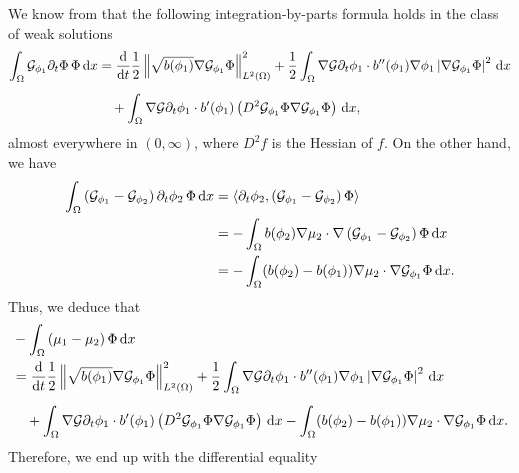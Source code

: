 \documentclass[11pt,reqno]{amsart}
\theoremstyle{remark}
\newcommand \norm[1] {\left\Vert #1\right\Vert}
\def\G{\mathcal{G}}
\def\d{{\rm d}}
\def \l {\langle}
\def \r {\rangle}
\def\uu{\boldsymbol{u}}
\def\ddt{\frac{\d}{\d t}}
\numberwithin{equation}{section}
\def\d{{\rm d}}
\begin{document}
We know from \cite[eq. (3.16)]{CGGG2025} that the following integration-by-parts  formula holds in the class of weak solutions
\begin{align}
\int_\Omega \G_{\phi_1} \partial_t \Phi \,  \Phi \, \d x
&= \ddt \frac{1}{2} \norm{\sqrt{b(\phi_1)}\nabla \G_{\phi_1} \Phi}_{L^2(\Omega)}^2
+\frac12 \int_\Omega \nabla \G \partial_t \phi_1 \cdot b''(\phi_1) \nabla \phi_1 \left| \nabla \G_{\phi_1} \Phi \right|^2 \, \d x \notag
\\[5pt]
&\quad +  \int_\Omega \nabla \G \partial_t \phi_1 \cdot  b'(\phi_1) \left( D^2 \G_{\phi_1} \Phi \nabla \G_{\phi_1} \Phi \right) \, \d x,
\label{IP-time}
\end{align}
almost everywhere in $(0,\infty)$, where $D^2 f$ is the Hessian of $f$.
On the other hand, we have
\begin{align}
\label{GdG}
\int_\Omega \left( \G_{\phi_1}-\G_{\phi_2} \right)
  \partial_t \phi_2 \,  \Phi \, \d x
&=
  \l
  \partial_t \phi_2,  \left( \G_{\phi_1}-\G_{\phi_2} \right)  \Phi \r\notag
\\
 & =
-
  \int_\Omega b(\phi_2)\nabla \mu_2 \cdot \nabla \left( \G_{\phi_1}-\G_{\phi_2} \right)  \Phi \, \d x\notag
\\
&=
- \int_\Omega (b(\phi_2)-b(\phi_1)) \nabla \mu_2 \cdot \nabla \G_{\phi_1} \Phi \, \d x.
\end{align}
Thus, we deduce that
\begin{align*}
&- \int_{\Omega} \left( \mu_1-\mu_2\right)  \Phi \, \d x
\\
&
=
\ddt \frac{1}{2} \norm{\sqrt{b(\phi_1)}\nabla \G_{\phi_1} \Phi}_{L^2(\Omega)}^2
+\frac12 \int_\Omega \nabla \G \partial_t \phi_1 \cdot b''(\phi_1) \nabla \phi_1 \left| \nabla \G_{\phi_1} \Phi \right|^2 \, \d x \notag
\\[5pt]
&\quad +  \int_\Omega \nabla \G \partial_t \phi_1 \cdot  b'(\phi_1) \left( D^2 \G_{\phi_1} \Phi \nabla \G_{\phi_1} \Phi \right) \, \d x  - \int_\Omega (b(\phi_2)-b(\phi_1)) \nabla \mu_2 \cdot \nabla \G_{\phi_1} \Phi \, \d x.
\end{align*}
Therefore, we end up with the differential equality
\end{document}

